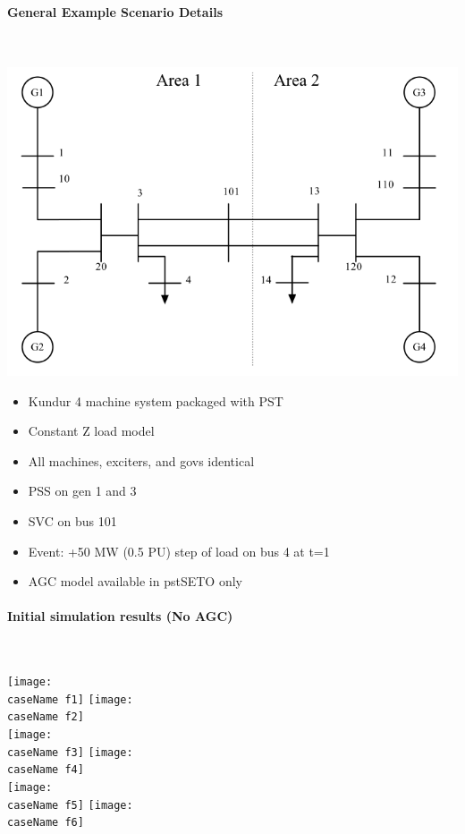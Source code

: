 \documentclass[12pt]{article}
\begin{document}
\paragraph{General Example Scenario Details} \ \\

\begin{center}
\includegraphics[width=.75\linewidth]{sysOneLineAreas}
\end{center}
\begin{itemize}
\item Kundur  4 machine system packaged with PST
\item Constant Z load model
\item All machines, exciters, and govs identical
\item PSS on gen 1 and 3
\item SVC on bus 101
\item Event: +50 MW (0.5 PU) step of load on bus 4 at t=1
\item AGC model available in pstSETO only
\end{itemize}

\pagebreak
\paragraph{Initial simulation results (No AGC)} \ \\


\begin{center}
\newcommand{\caseName}{NoAGC}
\texttt{[image: \\caseName f1]} %
\texttt{[image: \\caseName f2]} \\%
\texttt{[image: \\caseName f3]} %
\texttt{[image: \\caseName f4]} \\%
\texttt{[image: \\caseName f5]} %
\texttt{[image: \\caseName f6]} \\%
\end{center}
\end{document}
